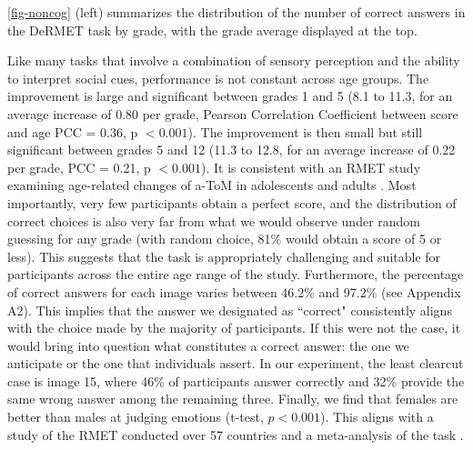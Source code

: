 \documentclass[11pt]{article}
\begin{document}
{\par \medskip


\par \medskip

\noindent \autoref{fig-noncog} (left) summarizes the distribution of the number of correct answers in the DeRMET task by grade, with the grade average displayed at the top.


Like many tasks that involve a combination of sensory perception and the ability to interpret social cues, performance is not  constant across age groups.  The improvement is large and significant between grades 1 and 5 (8.1 to 11.3, for an average increase of 0.80 per grade, Pearson Correlation Coefficient between score and age PCC = 0.36, p $<0.001$). The improvement is then small but still significant between grades 5 and 12 (11.3 to 12.8, for an average increase of 0.22 per grade, PCC = 0.21, p $<0.001$). It is consistent with an RMET study examining age-related changes of a-ToM in adolescents and adults \citep{moor2012neurodevelopmental}. Most importantly, very few participants obtain a perfect score, and the distribution of correct choices is also very far from what we would observe under random guessing for any grade (with random choice, 81\% would obtain a score of 5 or less).  This suggests that the task is appropriately challenging and suitable for participants across the entire age range of the study. Furthermore, the percentage of correct answers for each image varies between 46.2\% and 97.2\% (see Appendix A2). This implies that the answer we designated as ``correct" consistently aligns with the choice made by the majority of participants. If this were not the case, it would bring into question what constitutes a correct answer: the one we anticipate or the one that individuals assert. In our experiment, the least clearcut case is image 15, where 46\% of participants answer correctly and 32\% provide the same wrong answer among the remaining three. Finally, we find that females are better than males at judging emotions (t-test, $p<0.001$). This aligns with a study of the RMET conducted over 57 countries \citep{greenberg2023sex} and a meta-analysis of the task \citep{kirkland2013meta}. 
\par \medskip

}
\end{document}

